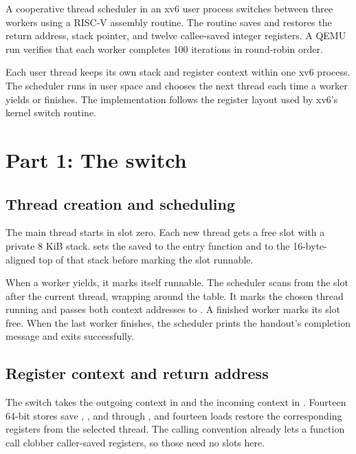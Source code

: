 \documentclass{../latex/utmreport}
\begin{document}
\makeutmreporttitlepage
\tableofcontents
\clearpage

\begin{utmabstract}[Abstract]
A cooperative thread scheduler in an xv6 user process switches between three workers using a RISC-V assembly routine. The routine saves and restores the return address, stack pointer, and twelve callee-saved integer registers. A QEMU run verifies that each worker completes 100 iterations in round-robin order.
\end{utmabstract}

\utmintroduction
Each user thread keeps its own stack and register context within one xv6 process. The scheduler runs in user space and chooses the next thread each time a worker yields or finishes. The implementation follows the register layout used by xv6's kernel switch routine.

\chapter{Part 1: The switch}

\section{Thread creation and scheduling}
The main thread starts in slot zero. Each new thread gets a free slot with a private 8 KiB stack.  sets the saved  to the entry function and  to the 16-byte-aligned top of that stack before marking the slot runnable.

When a worker yields, it marks itself runnable. The scheduler scans from the slot after the current thread, wrapping around the table. It marks the chosen thread running and passes both context addresses to . A finished worker marks its slot free. When the last worker finishes, the scheduler prints the handout's completion message and exits successfully.

\section{Register context and return address}
The switch takes the outgoing context in  and the incoming context in . Fourteen 64-bit stores save , , and  through , and fourteen loads restore the corresponding registers from the selected thread. The calling convention already lets a function call clobber caller-saved registers, so those need no slots here.
\end{document}
